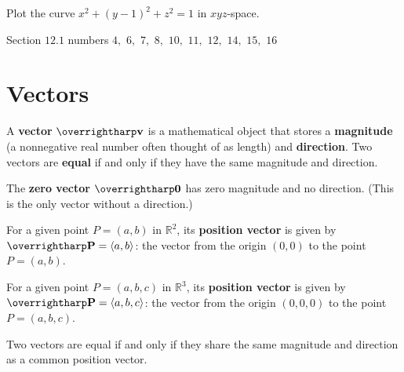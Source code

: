 \documentclass[letterpaper, twoside, 12pt]{book}
\begin{document}
          \begin{solution}

          \end{solution}

          \begin{problem}
            Plot the curve $x^2+(y-1)^2+z^2=1$ in $xyz$-space.
          \end{problem}

          \begin{solution}

          \end{solution}



\begin{suggestedHW}
Section $12.1$ numbers $4,$ $6,$ $7,$ $8,$ $10,$ $11,$ $12,$ $14,$ $15,$ $16$
\end{suggestedHW}



\section{Vectors}

\begin{definition}
  A \textbf{vector} $\harpvec v$ is a mathematical object that stores a
  \textbf{magnitude} (a nonnegative real number often thought of as length)
  and \textbf{direction}. Two vectors are \textbf{equal} if and only if they
  have the same magnitude and direction.
\end{definition}

\begin{definition}
  The \textbf{zero vector} $\harpvec0$ has zero magnitude and no direction.
  (This is the only vector without a direction.)
\end{definition}

\begin{definition}
  For a given point $P=(a,b)$ in $\mathbb{R}^2$, its \textbf{position vector}
  is given by $\harpvec{P}=\<a,b\>$: the vector from the origin $(0,0)$ to the
  point $P=(a,b)$.

  For a given point $P=(a,b,c)$ in $\mathbb{R}^3$, its \textbf{position vector}
  is given by $\harpvec{P}=\<a,b,c\>$: the vector from the origin $(0,0,0)$ to
  the point $P=(a,b,c)$.
\end{definition}

\begin{theorem}
  Two vectors are equal if and only if they share the same magnitude and
  direction as a common position vector.
\end{theorem}
\end{document}
